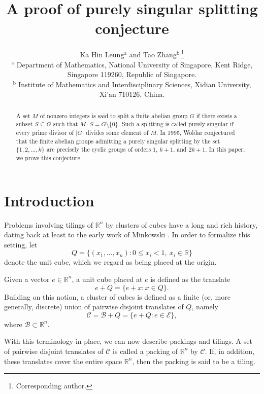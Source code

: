 \documentclass[12pt]{article}
\title{A proof of purely singular splitting conjecture}
\author{Ka Hin Leung$^{\text{a}}$ and  Tao Zhang$^{\text{b,}}$\thanks{Corresponding author.}\\
	\footnotesize $^{\text{a}}$ Department of Mathematics, National University of Singapore, Kent Ridge, Singapore 119260, Republic of Singapore. \\
    \footnotesize $^{\text{b}}$ Institute of Mathematics and Interdisciplinary Sciences, Xidian University, Xi'an 710126, China.\\
	}
\begin{document}
	\date{}
\maketitle

\begingroup
\renewcommand\thefootnote{}%
\addtocounter{footnote}{-1}%
\endgroup

\begin{abstract}

A set $M$ of nonzero integers is said to split a finite abelian group $G$ if there exists a subset $S\subseteq G$ such that $M\cdot S = G\setminus\{0\}$. Such a splitting is called purely singular if every prime divisor of $|G|$ divides some element of $M$. In 1995,
Woldar \cite{W1995} conjectured that the finite abelian groups admitting a purely singular splitting by the set $\{1,2,\dots,k\}$ are precisely the cyclic groups of orders $1$, $k+1$, and $2k+1$. In this paper, we prove this conjecture.
	
	\medskip
	
	
	\smallskip
	
\end{abstract}

\section{Introduction}
Problems involving tilings of $\mathbb{R}^n$ by clusters of cubes have a long and rich history, dating back at least to the early work of Minkowski \cite{M1907}. In order to formalize this setting, let
\[Q=\{(x_1,\dots,x_n): 0\le x_i<1,\ x_i\in\mathbb{R}\}\]
denote the unit cube, which we regard as being placed at the origin.

Given a vector $e\in\mathbb{R}^n$, a unit cube placed at $e$ is defined as the translate
\[e+Q=\{e+x: x\in Q\}.\]
Building on this notion, a cluster of cubes is defined as a finite (or, more generally, discrete) union of pairwise disjoint translates of $Q$, namely
\[\mathcal{C}=\mathcal{B}+Q=\{e+Q: e\in\mathcal{E}\},\]
where $\mathcal{B}\subset\mathbb{R}^n$.

With this terminology in place, we can now describe packings and tilings. A set of pairwise disjoint translates of $\mathcal{C}$ is called a packing of $\mathbb{R}^n$ by $\mathcal{C}$. If, in addition, these translates cover the entire space $\mathbb{R}^n$, then the packing is said to be a tiling.
\end{document}
